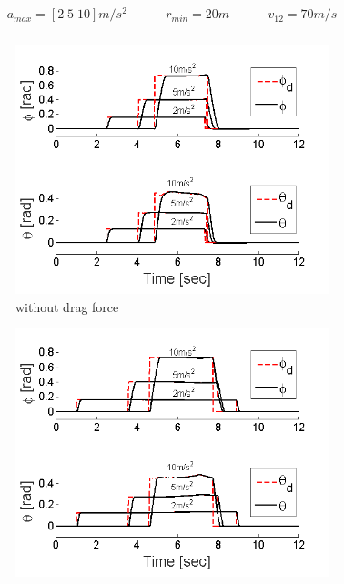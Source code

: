 \documentclass[journal,11pt,onecolumn,draftclsnofoot,]{IEEEtran}
\begin{document}
\begin{equation*}
\label{eq:safety_param}
\begin{split}
\begin{matrix}
a_{max} = \left[ 2 \; 5 \; 10 \right] m/s^2 \;\;\;\;\;\;\;\;&
r_{min} = 20m \;\;\;\;\;\;\;\;&
v_{12} = 70m/s \\
\end{matrix}
\end{split}
\end{equation*}

\begin{figure}
    \centering
    \begin{subfigure}{.45\columnwidth}
        \centering
        \includegraphics[width=\columnwidth]{roll_pitch_avoidance}
        \caption{without drag force}
        \label{fig:roll_pitch_avoidance_frictionless}
    \end{subfigure}
    \hfill
    \begin{subfigure}{.45\columnwidth}
        \centering
        \includegraphics[width=\columnwidth]{roll_pitch_avoidance_friction}

\end{subfigure}
\end{figure}
\end{document}
